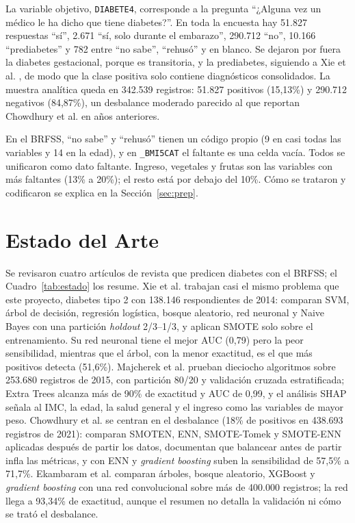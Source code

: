 La variable objetivo, \texttt{DIABETE4}, corresponde a la pregunta ``¿Alguna vez un médico le ha dicho que tiene diabetes?''. En toda la encuesta hay 51.827 respuestas ``sí'', 2.671 ``sí, solo durante el embarazo'', 290.712 ``no'', 10.166 ``prediabetes'' y 782 entre ``no sabe'', ``rehusó'' y en blanco. Se dejaron por fuera la diabetes gestacional, porque es transitoria, y la prediabetes, siguiendo a Xie et al. \cite{xie2019}, de modo que la clase positiva solo contiene diagnósticos consolidados. La muestra analítica queda en 342.539 registros: 51.827 positivos (15,13\%) y 290.712 negativos (84,87\%), un desbalance moderado parecido al que reportan Chowdhury et al. \cite{chowdhury2024} en años anteriores.

En el BRFSS, ``no sabe'' y ``rehusó'' tienen un código propio (9 en casi todas las variables y 14 en la edad), y en \texttt{\_BMI5CAT} el faltante es una celda vacía. Todos se unificaron como dato faltante. Ingreso, vegetales y frutas son las variables con más faltantes (13\% a 20\%); el resto está por debajo del 10\%. Cómo se trataron y codificaron se explica en la Sección~\ref{sec:prep}.

\section{Estado del Arte}\label{sec:estado}
Se revisaron cuatro artículos de revista que predicen diabetes con el BRFSS; el Cuadro~\ref{tab:estado} los resume. Xie et al. \cite{xie2019} trabajan casi el mismo problema que este proyecto, diabetes tipo 2 con 138.146 respondientes de 2014: comparan SVM, árbol de decisión, regresión logística, bosque aleatorio, red neuronal y Naive Bayes con una partición \textit{holdout} 2/3--1/3, y aplican SMOTE solo sobre el entrenamiento. Su red neuronal tiene el mejor AUC (0,79) pero la peor sensibilidad, mientras que el árbol, con la menor exactitud, es el que más positivos detecta (51,6\%). Majcherek et al. \cite{majcherek2025} prueban dieciocho algoritmos sobre 253.680 registros de 2015, con partición 80/20 y validación cruzada estratificada; Extra Trees alcanza más de 90\% de exactitud y AUC de 0,99, y el análisis SHAP señala al IMC, la edad, la salud general y el ingreso como las variables de mayor peso. Chowdhury et al. \cite{chowdhury2024} se centran en el desbalance (18\% de positivos en 438.693 registros de 2021): comparan SMOTEN, ENN, SMOTE-Tomek y SMOTE-ENN aplicadas después de partir los datos, documentan que balancear antes de partir infla las métricas, y con ENN y \textit{gradient boosting} suben la sensibilidad de 57,5\% a 71,7\%. Ekambaram et al. \cite{ekambaram2026} comparan árboles, bosque aleatorio, XGBoost y \textit{gradient boosting} con una red convolucional sobre más de 400.000 registros; la red llega a 93,34\% de exactitud, aunque el resumen no detalla la validación ni cómo se trató el desbalance.

